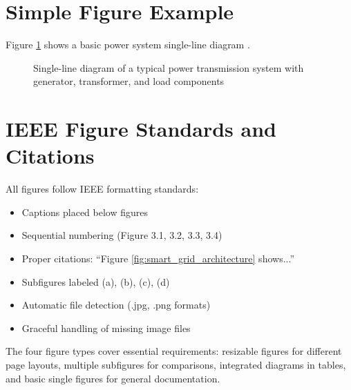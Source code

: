 \section{Simple Figure Example}
\label{sec:simple_figure}

Figure \ref{fig:power_system_diagram} shows a basic power system single-line diagram \cite{anderson1999power}.

\begin{figure}[htbp]
	\centering
	\caption{Single-line diagram of a typical power transmission system with generator, transformer, and load components}
	\label{fig:power_system_diagram}
\end{figure}

\section{IEEE Figure Standards and Citations}
\label{sec:ieee_figure_standards}

All figures follow IEEE formatting standards:

\begin{itemize}
	\item Captions placed below figures
	\item Sequential numbering (Figure 3.1, 3.2, 3.3, 3.4)
	\item Proper citations: ``Figure \ref{fig:smart_grid_architecture} shows...''
	\item Subfigures labeled (a), (b), (c), (d)
	\item Automatic file detection (.jpg, .png formats)
	\item Graceful handling of missing image files
\end{itemize}

The four figure types cover essential requirements: resizable figures for different page layouts, multiple subfigures for comparisons, integrated diagrams in tables, and basic single figures for general documentation.